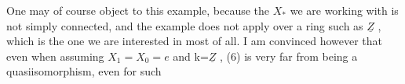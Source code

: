 One may of course object to this example, because the $X_{*}$ we are
working with is not simply connected, and   the example does not apply
 over a ring such as $\underline{Z}$ , which is the one we are interested in most
of all. I am convinced  however that even when assuming $X_1 = X_0 = e$
and k=$\underline{Z}$ , (6) is very far from being a quasiisomorphism, even for such

